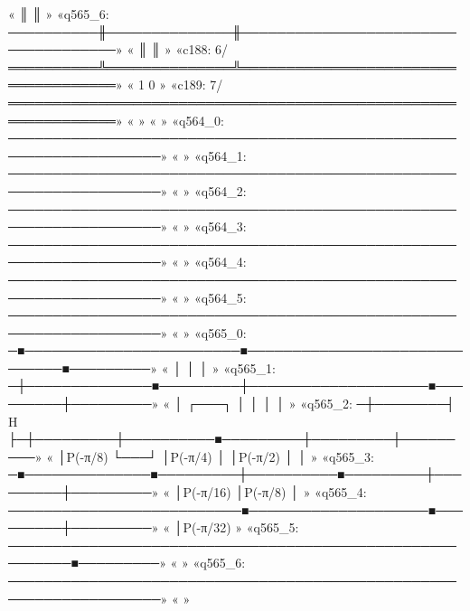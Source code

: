 «                  ║              ║                                    »
«q565_6: ──────────╫──────────────╫────────────────────────────────────»
«                  ║              ║                                    »
«c188: 6/══════════╩══════════════╩════════════════════════════════════»
«                  1              0                                    »
«c189: 7/══════════════════════════════════════════════════════════════»
«                                                                      »
«                                                                           »
«q564_0: ───────────────────────────────────────────────────────────────────»
«                                                                           »
«q564_1: ───────────────────────────────────────────────────────────────────»
«                                                                           »
«q564_2: ───────────────────────────────────────────────────────────────────»
«                                                                           »
«q564_3: ───────────────────────────────────────────────────────────────────»
«                                                                           »
«q564_4: ───────────────────────────────────────────────────────────────────»
«                                                                           »
«q564_5: ───────────────────────────────────────────────────────────────────»
«                                                                           »
«q565_0: ─■────────────────────────■──────────────────────────────■─────────»
«         │                        │                              │         »
«q565_1: ─┼──────────────■─────────┼────────────────────■─────────┼─────────»
«         │        ┌───┐ │         │                    │         │         »
«q565_2: ─┼────────┤ H ├─┼─────────┼──────────■─────────┼─────────┼─────────»
«         │P(-π/8) └───┘ │P(-π/4)  │          │P(-π/2)  │         │         »
«q565_3: ─■──────────────■─────────┼──────────■─────────┼─────────┼─────────»
«                                  │P(-π/16)            │P(-π/8)  │         »
«q565_4: ──────────────────────────■────────────────────■─────────┼─────────»
«                                                                 │P(-π/32) »
«q565_5: ─────────────────────────────────────────────────────────■─────────»
«                                                                           »
«q565_6: ───────────────────────────────────────────────────────────────────»
«                                                                           »
